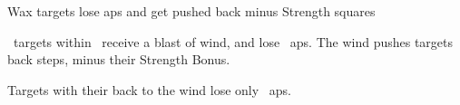 
  {\mAir}%
  {Wax}%
  {\duplicated}%
  {}%
  {targets lose  \glspl{ap} and get pushed back  minus Strength squares}%
  {
    \spellArea\ targets within \spellRange\ receive a blast of wind, and lose ~\glspl{ap}.
    The wind pushes targets back  steps, minus their Strength Bonus.

  Targets with their back to the wind lose only
  \setcounter{track}{\value{spelllevel}}%
  ~\glspl{ap}.
  }
